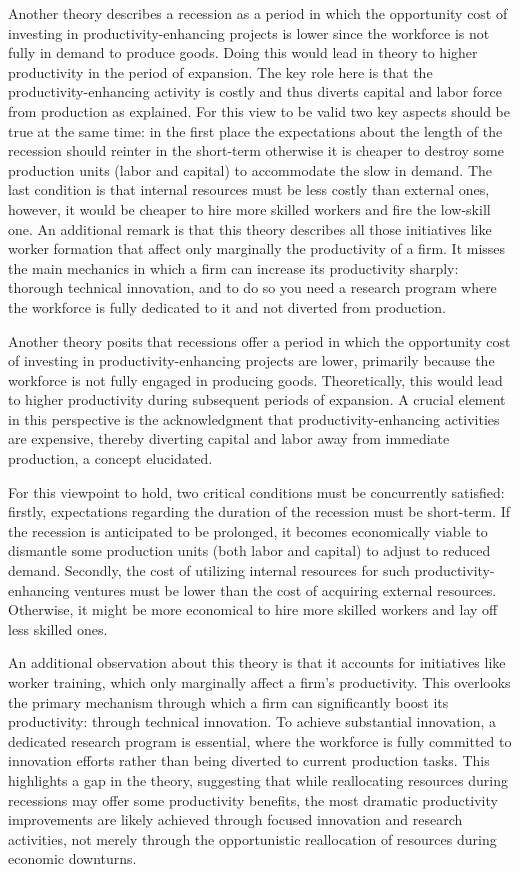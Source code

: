 \documentclass[12pt]{report}
\begin{document}
Another theory describes a recession as a period in which the opportunity cost of investing in productivity-enhancing
projects is lower since the workforce is not fully in demand to produce goods. Doing this would lead in theory to higher
productivity in the period of expansion. The key role here is that the productivity-enhancing activity is costly and thus
diverts capital and labor force from production as  \cite{Hay33} explained. 
For this view to be valid two key aspects should be true at the same time: in the first place the
expectations about the length of the recession should reinter in the short-term otherwise it is cheaper to destroy some
production units (labor and capital) to accommodate the slow in demand. The last condition is that internal resources
must be less costly than external ones, however, it would be cheaper to hire more skilled workers and fire the low-skill
one. An additional remark is that this theory describes all those initiatives like worker formation that affect only
marginally the productivity of a firm. It misses the main mechanics in which a firm can increase its productivity sharply: thorough technical
innovation, and to do so you need a research program where the workforce is fully dedicated to it and not
diverted from production.

Another theory posits that recessions offer a period in which the opportunity cost of investing in
productivity-enhancing projects are lower, primarily because the workforce is not fully engaged in producing goods.
Theoretically, this would lead to higher productivity during subsequent periods of expansion. A crucial element in this
perspective is the acknowledgment that productivity-enhancing activities are expensive, thereby diverting capital and
labor away from immediate production, a concept  \cite{Hay33} elucidated. 

For this viewpoint to hold, two critical conditions must be concurrently satisfied: firstly, expectations regarding the
duration of the recession must be short-term. If the recession is anticipated to be prolonged, it becomes economically
viable to dismantle some production units (both labor and capital) to adjust to reduced demand. Secondly, the cost of
utilizing internal resources for such productivity-enhancing ventures must be lower than the cost of acquiring external
resources. Otherwise, it might be more economical to hire more skilled workers and lay off less skilled ones.  

An additional observation about this theory is that it accounts for initiatives like worker training, which only
marginally affect a firm's productivity. This overlooks the primary mechanism through which a firm can significantly
boost its productivity: through technical innovation. To achieve substantial innovation, a dedicated research program is
essential, where the workforce is fully committed to innovation efforts rather than being diverted to current production
tasks. This highlights a gap in the theory, suggesting that while reallocating resources during recessions may offer
some productivity benefits, the most dramatic productivity improvements are likely achieved through focused
innovation and research activities, not merely through the opportunistic reallocation of resources during economic
downturns. 
\end{document}
